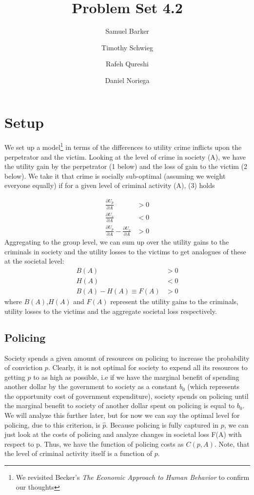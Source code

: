 \documentclass[12pt]{paper}
\title{Problem Set 4.2}
\author{Samuel Barker\and Timothy Schwieg\and Rafeh Qureshi\and Daniel Noriega}
\begin{document}
\maketitle


\section*{Setup}
We set up a model\footnote{We revisited Becker's \textit{The Economic
    Approach to Human Behavior} to confirm our thoughts} in terms of
the differences to utility crime inflicts upon the perpetrator and the
victim. Looking at the level of crime in society (A), we have the
utility gain by the perpetrator (1 below) and the loss of gain to the
victim (2 below). We take it that crime is socially sub-optimal
(assuming we weight everyone equally) if for a given level of criminal
activity (A), (3) holds 


\begin{align}
\frac{\partial U_p}{\partial A} & > 0 \\
\frac{\partial U_v}{\partial A} & < 0 \\
 \frac{\partial U_p}{\partial A} - \frac{\partial U_v}{\partial A} &> 0
\end{align}
Aggregating to the group level, we can sum up over the utility gains
to the criminals in society and the utility losses to the victims to
get analogues of these at the societal level:
\begin{align}
B(A) & > 0 \\
H(A) & < 0 \\
B(A)- H(A) \equiv F(A) &> 0
\end{align}
where $B(A)$,$H(A)$ and $F(A)$ represent the utility gains to the
criminals, utility losses to the victims and the aggregate societal
loss respectively.
\subsection*{Policing}
Society spends a given amount of resources on policing to increase the
probability of conviction $p$. Clearly, it is not optimal for society
to expend all its resources to getting $p$ to as high as possible, i.e
if we have the marginal benefit of spending another dollar by the
government to society as a constant $b_0$ (which represents the
opportunity cost of government expenditure), society spends on
policing until the marginal benefit to society of another dollar spent
on policing is equal to $b_0$. We will analyze this further later, but
for now we can say the optimal level for policing, due to this
criterion, is $\hat p$. Because policing is fully captured in $p$, we
can just look at the costs of policing and analyze changes in societal
loss F(A) with respect to p. Thus, we have the function of policing
costs as $C(p,A)$. Note, that the level of criminal activity itself is
a function of $p$.
\end{document}
